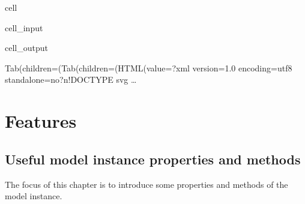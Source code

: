 \documentclass[letterpaper,10pt,english]{jupyterBook}
\begin{document}
\begin{sphinxuseclass}{cell}\begin{sphinxVerbatimInput}

\begin{sphinxuseclass}{cell_input}
\begin{sphinxVerbatim}[commandchars=\\\{\}]
\PYG{p}{[}\PYG{p}{]}
\end{sphinxVerbatim}

\end{sphinxuseclass}\end{sphinxVerbatimInput}
\begin{sphinxVerbatimOutput}

\begin{sphinxuseclass}{cell_output}
\begin{sphinxVerbatim}[commandchars=\\\{\}]
Tab(children=(Tab(children=(HTML(value=\PYGZsq{}\PYGZlt{}?xml version=\PYGZdq{}1.0\PYGZdq{} encoding=\PYGZdq{}utf\PYGZhy{}8\PYGZdq{} standalone=\PYGZdq{}no\PYGZdq{}?\PYGZgt{}\PYGZbs{}n\PYGZlt{}!DOCTYPE svg …
\end{sphinxVerbatim}

\begin{sphinxVerbatim}[commandchars=\\\{\}]

\end{sphinxVerbatim}

\end{sphinxuseclass}\end{sphinxVerbatimOutput}

\end{sphinxuseclass}
\sphinxstepscope


\part{Features}

\sphinxstepscope


\chapter{Useful model instance properties and methods}
\label{\detokenize{content/notebooks/modelflow_features:useful-model-instance-properties-and-methods}}\label{\detokenize{content/notebooks/modelflow_features::doc}}
\sphinxAtStartPar
The focus of this chapter is to introduce some properties and methods of the model instance.
\end{document}
